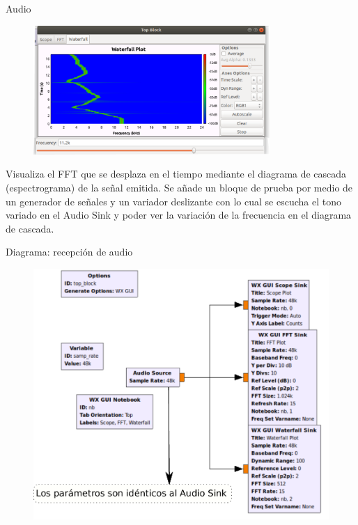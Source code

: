 \begin{frame}{Audio}

\begin{figure}

\begin{center}
\vspace{-6mm}
\includegraphics[width=0.8\textwidth]{parte1/lab3/pdf/lab3_6.pdf}
\end{center}
\end{figure}
\vspace{-3mm}

Visualiza el FFT que se desplaza en el tiempo mediante el diagrama de cascada (espectrograma) de la señal emitida. Se añade un bloque de prueba por medio de un generador de señales y un variador deslizante con lo cual se escucha el tono variado en el Audio Sink y poder ver la variación de la frecuencia en el diagrama de cascada.
\end{frame}

\begin{frame}{Diagrama: recepción de audio}

\begin{figure}

\begin{center}
\includegraphics[width=.73\textwidth]{parte1/lab3/pdf/lab3_7.pdf}
\end{center}
\end{figure}

\end{frame}

